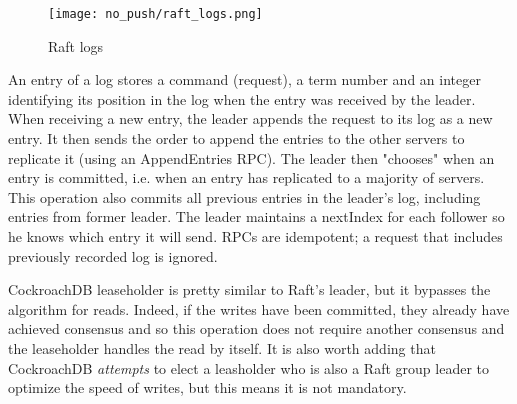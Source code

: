 \begin{figure}[H]
  \vspace{-10pt}
  \centering
  \centerline{\texttt{[image: no\_push/raft\_logs.png]}}
  \vspace{-5pt}
  \caption{Raft logs\cite{DBLP:conf/usenix/OngaroO14}}
  \vspace{-5pt}
  \label{fig:raft-log}
\end{figure}


An entry of a log stores a command (request), a term number and an integer identifying its position in the log when the entry was received by the leader. When receiving a new entry, the leader appends the request to its log as a new entry. It then sends the order to append the entries to the other servers to replicate it (using an AppendEntries RPC). The leader then "chooses" when an entry is committed, i.e. when an entry has replicated to a majority of servers. This operation also commits all previous entries in the leader's log, including entries from former leader. The leader maintains a nextIndex for each follower so he knows which entry it will send. RPCs are idempotent; a request that includes previously recorded log is ignored.


CockroachDB leaseholder is pretty similar to Raft's leader, but it bypasses the algorithm for reads. Indeed, if the writes have been committed, they already have achieved consensus and so this operation does not require another consensus and the leaseholder handles the read by itself. It is also worth adding that CockroachDB \emph{attempts} to elect a leasholder who is also a Raft group leader to optimize the speed of writes, but this means it is not mandatory\cite{CRDB:replication-layer}.
